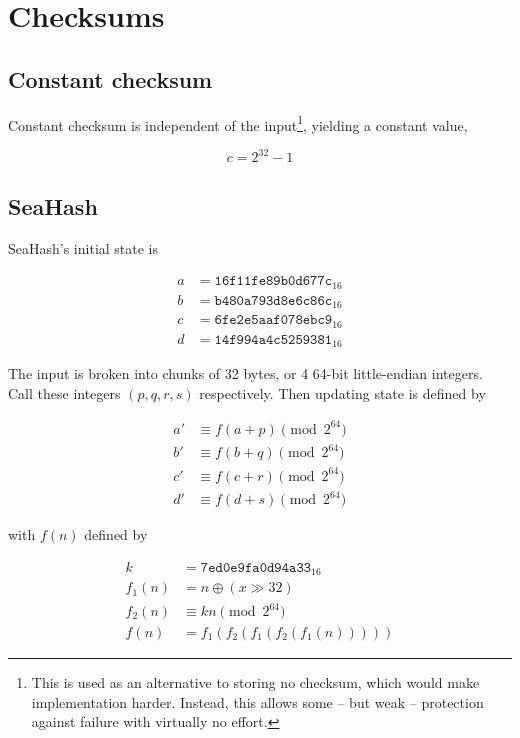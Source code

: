 \documentclass[11pt,a4paper]{report}
\begin{document}
    \section{Checksums}
        \subsection{Constant checksum}
        \label{checksum:seahash}
        Constant checksum is independent of the input\footnote{This is used as
        an alternative to storing no checksum, which would make implementation
        harder. Instead, this allows some -- but weak -- protection against failure
        with virtually no effort.}, yielding a constant value,

        $$c = 2^{32} - 1$$

        \subsection{SeaHash}
        \label{checksum:seahash}
        SeaHash's initial state is

        \begin{align*}
            a &= \texttt{16f11fe89b0d677c}_{16} \\
            b &= \texttt{b480a793d8e6c86c}_{16} \\
            c &= \texttt{6fe2e5aaf078ebc9}_{16} \\
            d &= \texttt{14f994a4c5259381}_{16}
        \end{align*}

        The input is broken into chunks of 32 bytes, or 4 64-bit little-endian
        integers. Call these integers $(p, q, r, s)$ respectively. Then
        updating state is defined by

        \begin{align*}
            a' &\equiv f(a + p) \pmod{2^{64}} \\
            b' &\equiv f(b + q) \pmod{2^{64}} \\
            c' &\equiv f(c + r) \pmod{2^{64}} \\
            d' &\equiv f(d + s) \pmod{2^{64}}
        \end{align*}

        with $f(n)$ defined by

        \begin{align*}
            k      &=      \texttt{7ed0e9fa0d94a33}_{16} \\
            f_1(n) &=      n \oplus (x \gg 32) \\
            f_2(n) &\equiv kn \pmod{2^{64}} \\
            f(n)   &=      f_1(f_2(f_1(f_2(f_1(n)))))
        \end{align*}
\end{document}
